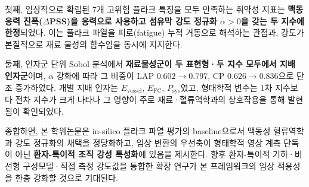 \documentclass[master,english,final]{kaist-ucs}
\begin{document}
첫째, 임상적으로 확립된 7개 고위험 플라크 특징을 모두 만족하는 취약성 지표는 \textbf{맥동 응력 진폭($\Delta$PSS)을 응력으로 사용하고 섬유막 강도 정규화 $\alpha>0$을 갖는 두 지수에 한정}되었다. 이는 플라크 파열을 피로(fatigue) 누적 거동으로 해석하는 관점과, 강도가 본질적으로 재료 물성의 함수임을 동시에 지지한다.

둘째, 인자군 단위 Sobol 분석에서 \textbf{재료물성군이 두 표현형·두 지수 모두에서 지배 인자군}이며, $\alpha$ 강화에 따라 그 비중이 LAP $0.602 \to 0.797$, CP $0.626 \to 0.836$으로 단조 증가하였다. 개별 지배 인자는 $E_\mathrm{vessel}$, $E_\mathrm{FC}$, $P_\mathrm{sys}$였고, 형태학적 변수는 1차 지수보다 전차 지수가 크게 나타나 그 영향이 주로 재료·혈류역학과의 상호작용을 통해 발현됨이 확인되었다.

종합하면, 본 학위논문은 in-silico 플라크 파열 평가의 baseline으로서 맥동성 혈류역학과 강도 정규화의 채택을 정당화하고, 임상 변환의 우선축이 형태학적 영상 계측 단독이 아닌 \textbf{환자-특이적 조직 강성 특성화}에 있음을 제시한다. 향후 환자-특이적 기하·비선형 구성모델·직접 측정 강도값을 통합한 확장 연구가 본 프레임워크의 임상 적용성을 한층 강화할 것으로 기대된다.
\end{document}

